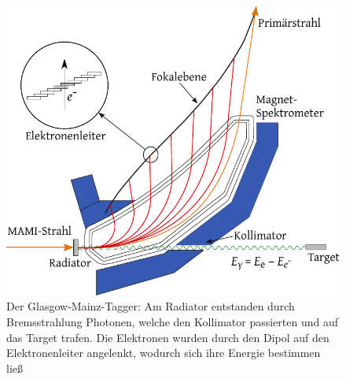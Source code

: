 \documentclass[a4paper,11pt,oneside,final,german,openbib,pdftex]{scrbook}
\begin{document}
{\begin{figure}[h]
	\begin{center}
	\includegraphics{TAGGER}
	
	\caption{Der Glasgow-Mainz-Tagger: Am Radiator entstanden durch Bremsstrahlung Photonen, welche den Kollimator passierten und auf das Target trafen. Die Elektronen wurden durch den Dipol auf den Elektronenleiter angelenkt, wodurch sich ihre Energie bestimmen lie{\ss}\cite{Un08}}
\label{fig.TAGGER}	
\end{center}
\end{figure}
 
 
}
\end{document}
